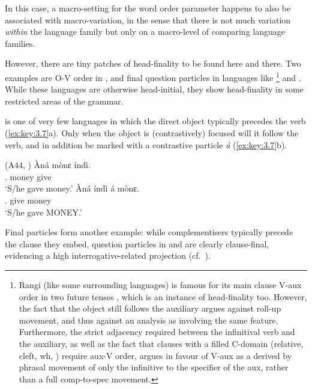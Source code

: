 \documentclass[output=paper]{langsci/langscibook}
\begin{document}
In this case, a macro-setting for the word order parameter happens to also be
associated with macro-variation, in the sense that there is not much variation
\emph{within} the  language family but only on a macro-level of comparing
language families.

However, there are tiny patches of head-finality to be found here and there.
Two examples are O-V order in , and final question particles in languages
like \footnote{Rangi (like some surrounding languages) is famous for its
main clause V-aux order in two future tenses \citep{Gibson2016}, which is an
instance of head-finality too. However, the fact that the object still follows
the auxiliary argues against roll-up movement, and thus
against an analysis as involving the same feature. Furthermore, the strict
adjacency required between the infinitival verb and the auxiliary, as well as
the fact that clauses with a filled C-domain (relative, cleft, wh, )
require aux-V order,  argues in favour of V-aux as a derived by phrasal
movement of only the infinitive to the specifier of the aux,
rather than a full comp-to-spec movement.} and .  While these languages are
otherwise head-initial, they show head-finality in some restricted areas of the
grammar.

 is one of very few  languages in which the direct object typically
precedes the verb (\ref{ex:key:3.7}a). Only when the object is (contrastively)
focused will it follow the verb, and in addition be marked with a contrastive
particle \emph{á} (\ref{ex:key:3.7}b).

\ea\label{bkm:Ref373494395}\label{ex:key:3.7} (A44, \citealt[126]{Mous1997})
    \ea
    \gll 	\`{A}ná  mònɛ  índì.\\
            \Tsg{}.\Pst{}  money  give\\
    \glt    \enquote*{S/he gave money.}
    \ex
    \gll 	\`{A}ná  índì  á  mònɛ.\\
            \Tsg{}.\Pst{}  give  \Ptcl{}  money\\
    \glt    \enquote*{S/he gave MONEY.}
    \z
\z

Final particles form another example: while complementisers typically precede
the clause they embed, question particles in  and  are clearly
clause-final, evidencing a high interrogative-related projection (cf.\
\citealt{Buell2005,Buell2011}).
\end{document}
